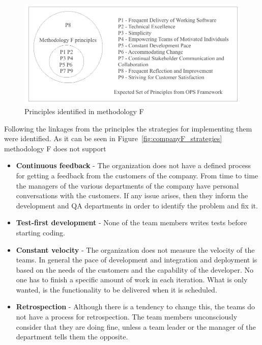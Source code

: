 \begin{figure}[H]
\centerline{\includegraphics[scale=0.9]{include/case_study/fig/companyF_principles.pdf}}
\caption{Principles identified in methodology F} 
\label{fig:companyF_principles}
\end{figure}

Following the linkages from the principles the strategies for implementing them were identified. As it can be seen in Figure~\ref{fig:companyF_strategies} methodology F does not support 

\begin{itemize}
\item \textbf{Continuous feedback} - The organization does not have a defined process for getting a feedback from the customers of the company. From time to time the managers of the various departments of the company have personal conversations with the customers. If any issue arises, then they inform the development and QA departments in order to identify the problem and fix it.
\item \textbf{Test-first development} - None of the team members writes tests before starting coding.
\item \textbf{Constant velocity} - The organization does not measure the velocity of the teams. In general the pace of development and integration and deployment is based on the needs of the customers and the capability of the developer. No one has to finish a specific amount of work in each iteration. What is only wanted, is the functionality to be delivered when it is scheduled.
\item \textbf{Retrospection} - Although there is a tendency to change this, the teams do not have a process for retrospection. The team members unconsciously consider that they are doing fine, unless a team leader or the manager of the department tells them the opposite.
\end{itemize}

